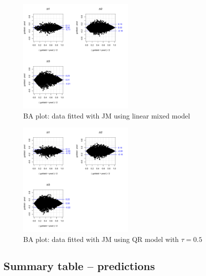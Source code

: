 \documentclass{article}
\begin{document}
\begin{figure}[H]
\centering
\includegraphics[width=0.5\textwidth]{ba_normdata_meanfit.pdf}
\caption{BA plot: data fitted with JM using linear mixed model}
\end{figure}

\begin{figure}[H]
\centering
\includegraphics[width=0.5\textwidth]{ba_normdata_medianfit.pdf}
\caption{BA plot: data fitted with JM using QR model with $\tau=0.5$}
\end{figure}





\subsection{Summary table -- predictions}
\end{document}
